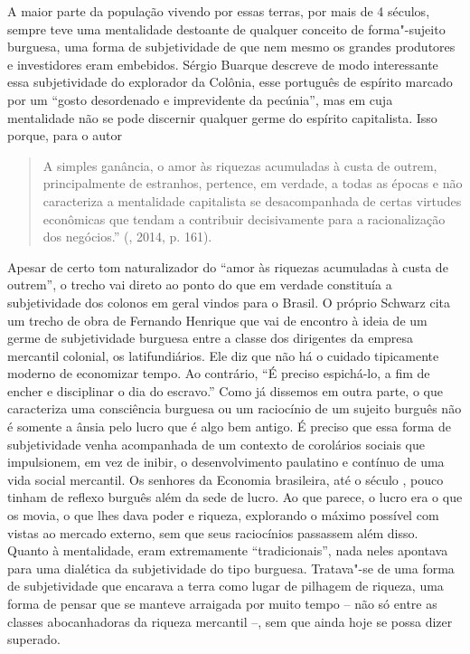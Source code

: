 {A maior parte da população vivendo por essas terras, por mais de 4 séculos, sempre
teve uma mentalidade destoante de qualquer conceito de forma"-sujeito burguesa, uma
forma de subjetividade de que nem mesmo os grandes produtores e investidores eram
embebidos. Sérgio Buarque descreve de modo interessante essa
subjetividade do explorador da Colônia, esse português de espírito
marcado por um ``gosto desordenado e imprevidente da pecúnia'', mas em
cuja mentalidade não se pode discernir qualquer germe do espírito
capitalista. Isso porque, para o autor

\begin{quote}
A simples ganância, o amor às riquezas acumuladas à custa de outrem,
principalmente de estranhos, pertence, em verdade, a todas as épocas e
não caracteriza a mentalidade capitalista se desacompanhada de certas
virtudes econômicas que tendam a contribuir decisivamente para a
racionalização dos negócios.'' (, 2014, p. 161).
\end{quote}

Apesar de certo tom naturalizador do ``amor às riquezas acumuladas à
custa de outrem'', o trecho vai direto ao ponto do que em verdade
constituía a subjetividade dos colonos em geral vindos para o Brasil. O
próprio Schwarz cita um trecho de obra de Fernando Henrique que vai de
encontro à ideia de um germe de subjetividade burguesa entre a classe
dos dirigentes da empresa mercantil colonial, os latifundiários. Ele diz
que não há o cuidado tipicamente moderno de economizar tempo. Ao
contrário, ``É preciso espichá-lo, a fim de encher e disciplinar o dia
do escravo.'' Como já dissemos em outra parte, o que caracteriza uma
consciência burguesa ou um raciocínio de um sujeito burguês não é
somente a ânsia pelo lucro que é algo bem antigo. É preciso que essa
forma de subjetividade venha acompanhada de um contexto de corolários
sociais que impulsionem, em vez de inibir, o desenvolvimento paulatino
e contínuo de uma vida social mercantil. Os senhores da Economia
brasileira, até o século , pouco tinham de reflexo burguês além da
sede de lucro. Ao que parece, o lucro era o que os movia, o que lhes
dava poder e riqueza, explorando o máximo possível com vistas ao mercado
externo, sem que seus raciocínios passassem além disso. Quanto à
mentalidade, eram extremamente ``tradicionais'', nada neles apontava
para uma dialética da subjetividade do tipo burguesa. Tratava"-se de uma
forma de subjetividade que encarava a terra como lugar de pilhagem de
riqueza, uma forma de pensar que se manteve arraigada por muito tempo --
não só entre as classes abocanhadoras da riqueza mercantil --, sem que
ainda hoje se possa dizer superado.

}

